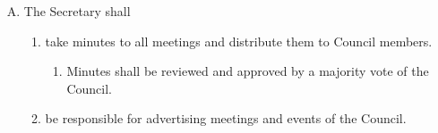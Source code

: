 \documentclass[letterpaper,12pt]{article}
\begin{document}
\begin{enumerate} [A.]
\begin{enumerate}[1.]
		\item handle all purchases and other monetary transactions of the Council.
		\item authorize members to charge against the Council's account for amounts less than \$50. Expenditures exceeding this amount require a majority approval of the Council.
		\item keep a record of all Council expenses.
		\item make monthly reports to the Council of its financial status.
	\end{enumerate}
	\item The Secretary shall
	\begin{enumerate}[1.]
		\item take minutes to all meetings and distribute them to Council members.
		\begin{enumerate}[1.]
			\item Minutes shall be reviewed and approved by a majority vote of the Council.
		\end{enumerate}
		\item be responsible for advertising meetings and events of the Council.
	\end{enumerate}
\end{enumerate}
\end{document}
